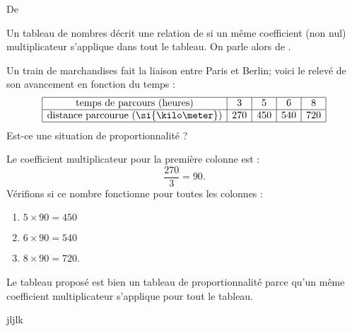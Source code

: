 


De \cite{NRHooXFvgpp5}


\begin{Aretenir}
    Un tableau de nombres décrit une relation de  si un même coefficient (non nul) multiplicateur s’applique dans tout le tableau. On parle alors de .
\end{Aretenir}

\begin{example}
    Un train de marchandises fait la liaison entre Paris et Berlin; voici le relevé de son avancement en fonction du temps :
    \begin{equation*}
        \begin{array}[]{|c|c|c|c|c|}
            \hline
            \text{temps de parcours (heures)}&3&5&6&8\\
            \hline
            \text{distance parcourue (\si{\kilo\meter})}&270&450&540&720\\
            \hline
        \end{array}
    \end{equation*}
    Est-ce une situation de proportionnalité ?

    Le coefficient multiplicateur pour la première colonne est :
    \begin{equation}
        \frac{ 270 }{ 3 }=90.
    \end{equation}
    Vérifions si ce nombre fonctionne pour toutes les colonnes :
    \begin{enumerate}
        \item
            \( 5\times 90=450\)
        \item
            \( 6\times 90=540\)
        \item
            \( 8\times 90=720\).
    \end{enumerate}
    Le tableau proposé est bien un tableau de proportionnalité parce qu'un même coefficient multiplicateur s'applique pour tout le tableau.
\end{example}



jljlk



